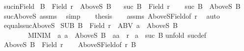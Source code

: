 \begin{isabellebody}
\ suc{\isacharunderscore}{\kern0pt}inField{\isacharcolon}{\kern0pt}\isanewline
{}\ {\isachardoublequoteopen}B\ {\isasymle}\ Field\ r{\isachardoublequoteclose}\ \ {\isachardoublequoteopen}AboveS\ B\ {\isasymnoteq}\ {\isacharbraceleft}{\kern0pt}{\isacharbraceright}{\kern0pt}{\isachardoublequoteclose}\isanewline
{}\ {\isachardoublequoteopen}suc\ B\ {\isasymin}\ Field\ r{\isachardoublequoteclose}\isanewline
%
\isadelimproof
%
\endisadelimproof
%
\isatagproof
{}\isamarkupfalse%
{\isacharminus}{\kern0pt}\isanewline
\ \ \isamarkupfalse%
\ {\isachardoublequoteopen}suc\ B\ {\isasymin}\ AboveS\ B{\isachardoublequoteclose}\ \isamarkupfalse%
\ suc{\isacharunderscore}{\kern0pt}AboveS\ assms\ \isamarkupfalse%
\ simp\isanewline
\ \ \isamarkupfalse%
\ {\isacharquery}{\kern0pt}thesis\isanewline
\ \ \isamarkupfalse%
\ assms\ AboveS{\isacharunderscore}{\kern0pt}Field{\isacharbrackleft}{\kern0pt}of\ r{\isacharbrackright}{\kern0pt}\ \isamarkupfalse%
\ auto\isanewline
{}\isamarkupfalse%
%
\endisatagproof
{\isafoldproof}%
%
\isadelimproof
\isanewline
%
\endisadelimproof
\isanewline
{}\isamarkupfalse%
\ equals{\isacharunderscore}{\kern0pt}suc{\isacharunderscore}{\kern0pt}AboveS{\isacharcolon}{\kern0pt}\isanewline
{}\ SUB{\isacharcolon}{\kern0pt}\ {\isachardoublequoteopen}B\ {\isasymle}\ Field\ r{\isachardoublequoteclose}\ \ ABV{\isacharcolon}{\kern0pt}\ {\isachardoublequoteopen}a\ {\isasymin}\ AboveS\ B{\isachardoublequoteclose}\ \isanewline
\ \ \ \ \ \ \ \ MINIM{\isacharcolon}{\kern0pt}\ {\isachardoublequoteopen}{\isasymAnd}\ a{\isacharprime}{\kern0pt}{\isachardot}{\kern0pt}\ a{\isacharprime}{\kern0pt}\ {\isasymin}\ AboveS\ B\ {\isasymLongrightarrow}\ {\isacharparenleft}{\kern0pt}a{\isacharcomma}{\kern0pt}a{\isacharprime}{\kern0pt}{\isacharparenright}{\kern0pt}\ {\isasymin}\ r{\isachardoublequoteclose}\isanewline
{}\ {\isachardoublequoteopen}a\ {\isacharequal}{\kern0pt}\ suc\ B{\isachardoublequoteclose}\isanewline
%
\isadelimproof
%
\endisadelimproof
%
\isatagproof
{}\isamarkupfalse%
{\isacharparenleft}{\kern0pt}unfold\ suc{\isacharunderscore}{\kern0pt}def{\isacharparenright}{\kern0pt}\isanewline
\ \ \isamarkupfalse%
\ {\isachardoublequoteopen}AboveS\ B\ {\isasymle}\ Field\ r{\isachardoublequoteclose}\isanewline
\ \ \isamarkupfalse%
\ AboveS{\isacharunderscore}{\kern0pt}Field{\isacharbrackleft}{\kern0pt}of\ r\ B{\isacharbrackright}{\kern0pt}\ \isamarkupfalse%

\end{isabellebody}
